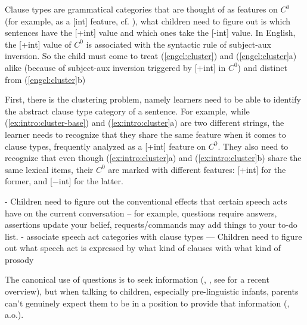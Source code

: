 

Clause types are grammatical categories that are thought of as features on $C^{0}$ (for example, as a [\textpm int] feature,  cf. \cite{katzpostal1964, baker1970int, langacker1974q, chomsky1995, rizzi1997, rizzi2001int, chomskylasnik1977, cheng1991}), what children need to figure out is which sentences have the [+int] value and which ones take the [-int] value. In English, the [+int] value of $C^{0}$ is associated with the syntactic rule of subject-aux inversion. So the child must come to treat (\ref{engcl:cluster}) and (\ref{engcl:cluster}a) alike (because of subject-aux inversion triggered by [+int] in $C^{0}$) and distinct from (\ref{engcl:cluster}b)

First, there is the clustering problem, namely learners need to be able to identify the abstract clause type category of a sentence. For example, while (\ref{ex:intro:cluster-base}) and (\ref{ex:intro:cluster}a) are two different strings, the learner needs to recognize that they share the same feature when it comes to clause types, frequently analyzed as a [+int] feature on $C^{0}$. They also need to recognize that even though (\ref{ex:intro:cluster}a) and (\ref{ex:intro:cluster}b) share the same lexical items, their $C^{0}$ are marked with different features: [+int] for the former, and [$-$int] for the latter.

- Children need to figure out the conventional effects that certain speech acts have on the current conversation
-- for example, questions require answers, assertions update your belief, requests/commands may add things to your to-do list.
- associate speech act categories with clause types
--- Children need to figure out what speech act is expressed by what kind of clauses with what kind of prosody

The canonical use of questions is to seek information (\citealt{searle1975tax}, \citealt{levinson1983}, see \citealt{krifka2011q} for a recent overview), but when talking to children, especially pre-linguistic infants, parents can’t genuinely expect them to be in a position to provide that information (\citealt{holzman1972, shatz1978comprehension, tamir1980, yu2019pedagogical}, a.o.).




